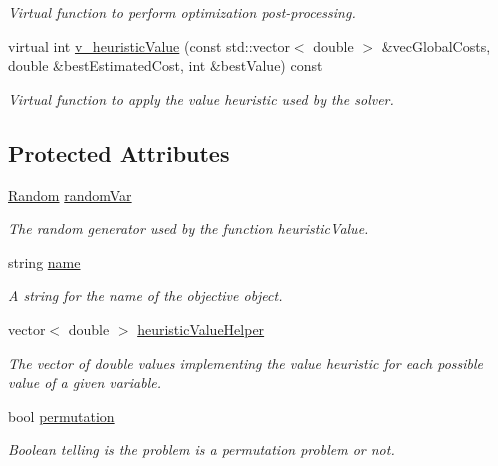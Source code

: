 \begin{DoxyCompactItemize}
\begin{DoxyCompactList}\small\item\em Virtual function to perform optimization post-\/processing. \end{DoxyCompactList}\item 
virtual int \hyperlink{classghost_1_1Objective_a03311ba62213580f1664f164e5f5696a}{v\-\_\-heuristic\-Value} (const std\-::vector$<$ double $>$ \&vec\-Global\-Costs, double \&best\-Estimated\-Cost, int \&best\-Value) const 
\begin{DoxyCompactList}\small\item\em Virtual function to apply the value heuristic used by the solver. \end{DoxyCompactList}\end{DoxyCompactItemize}
\subsection*{Protected Attributes}
\begin{DoxyCompactItemize}
\item 
\hyperlink{classghost_1_1Random}{Random} \hyperlink{classghost_1_1Objective_a442da333edc70f47c33a15987c2a81b8}{random\-Var}
\begin{DoxyCompactList}\small\item\em The random generator used by the function heuristic\-Value. \end{DoxyCompactList}\item 
string \hyperlink{classghost_1_1Objective_ae9533a52b3600c826df6e20c65db1e7a}{name}
\begin{DoxyCompactList}\small\item\em A string for the name of the objective object. \end{DoxyCompactList}\item 
vector$<$ double $>$ \hyperlink{classghost_1_1Objective_a9bfe64f13de15bba7f2fa3a662c02e27}{heuristic\-Value\-Helper}
\begin{DoxyCompactList}\small\item\em The vector of double values implementing the value heuristic for each possible value of a given variable. \end{DoxyCompactList}\item 
bool \hyperlink{classghost_1_1Objective_aae8345f4b7981f4b386eb58e447e0286}{permutation}
\begin{DoxyCompactList}\small\item\em Boolean telling is the problem is a permutation problem or not. \end{DoxyCompactList}\end{DoxyCompactItemize}


